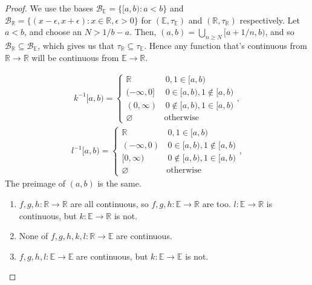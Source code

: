 \documentclass[12pt]{extarticle}
\newcommand{\set}[1]{\{#1\}}
\newcommand{\R}{\mathbb{R}}
\newcommand{\<}{\langle}
\renewcommand{\>}{\rangle}
\renewcommand{\emptyset}{\varnothing}
\theoremstyle{definition}
\begin{document}
\begin{proof}
  We use the bases $\mathcal{B}_{\mathbb{E}} = \set{[a,b): a<b}$ and $\mathcal{B}_{\mathbb{R}} = \set{(x-\epsilon,x+\epsilon): x \in \R, \epsilon>0}$ for $(\mathbb{E}, \tau_\mathbb{E})$ and $(\mathbb{R}, \tau_\mathbb{R})$ respectively.
    Let $a<b$, and choose an $N > 1/b-a$. Then, $(a,b) = \bigcup\limits_{n \geq N}[a+1/n,b)$, and so $\mathcal{B}_{\mathbb{R}} \subseteq \mathcal{B}_{\mathbb{E}}$, which gives us that $\tau_\mathbb{R} \subseteq \tau_\mathbb{E}$. Hence any function that's continuous from $\R \to \R$ will be continuous from $\mathbb{E} \to \mathbb{R}$.
      
      \begin{align*}
        k^{-1}[a,b) =
          \begin{cases}
            \R \quad & \, 0,1 \in [a,b) \\
              (-\infty,0] & \, 0 \in [a,b), 1 \not \in [a,b) \\
                (0,\infty) & \, 0 \not \in [a,b), 1 \in [a,b) \\
                    \emptyset \, &\text{otherwise} 
          \end{cases},
      \end{align*}
      \begin{align*}
        l^{-1}[a,b) =
          \begin{cases}
            \R \quad & \, 0,1 \in [a,b) \\
              (-\infty,0) & \, 0 \in [a,b), 1 \not \in [a,b) \\
                  [0,\infty) & \, 0 \not \in [a,b), 1 \in [a,b) \\
                        \emptyset \, &\text{otherwise} 
          \end{cases},
      \end{align*}
      The preimage of $(a,b)$ is the same.

      \begin{enumerate}
      \item
        $f,g,h: \R \to \R$ are all continuous, so $f,g,h: \mathbb{E} \to \R$ are too. $l: \mathbb{E} \to \mathbb{R}$ is continuous, but $k: \mathbb{E} \to \mathbb{R}$ is not.
      \item
        None of $f,g,h,k,l: \R \to \mathbb{E}$ are continuous.
      \item
        $f,g,h,l: \mathbb{E} \to \mathbb{E}$ are continuous, but $k: \mathbb{E} \to \mathbb{E}$ is not.
      \end{enumerate}
\end{proof}
\end{document}
